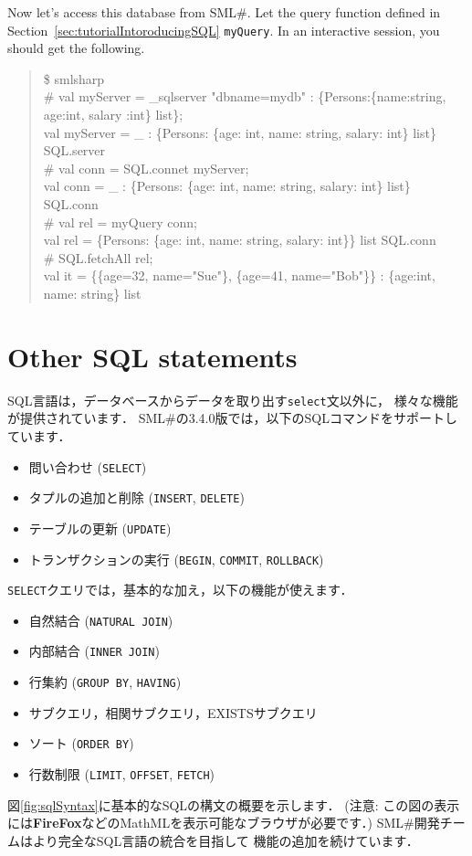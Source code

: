 \documentclass{jbook}
\newcommand{\txt}[2]{#2}
\newcommand{\smlsharp}{SML\#}
\newcommand{\version}{3.4.0}
\newenvironment{program}{\begin{quote}\begin{tt}}%
                        {\end{tt}\end{quote}}
\begin{document}
	Now let's access this database from \smlsharp{}.
	Let the query function defined in Section~\ref{sec:tutorialIntoroducingSQL}
{\tt myQuery}.
	In an interactive session, you should get the following.
\begin{program}
\$ smlsharp\\
\# val myServer = \_sqlserver "dbname=mydb" : \{Persons:\{name:string, age:int, salary :int\} list\};\\
val myServer = \_ : \{Persons: \{age: int, name: string, salary: int\} list\} SQL.server\\
\# val conn = SQL.connet myServer;\\
val conn = \_ : \{Persons: \{age: int, name: string, salary: int\} list\} SQL.conn\\
\# val rel = myQuery conn;\\
val rel = \{Persons: \{age: int, name: string, salary: int\}\} list SQL.conn\\
\# SQL.fetchAll rel;\\
val it = \{\{age=32, name="Sue"\}, \{age=41, name="Bob"\}\} : \{age:int, name: string\} list
\end{program}
\fi%

\section{\txt{その他のSQL文}{Other SQL statements}}
\label{sec:tutorialOtherSQLElement}

\ifjp%
	SQL言語は，データベースからデータを取り出す{\tt select}文以外に，
様々な機能が提供されています．
	\smlsharp{}の\version{}版では，以下のSQLコマンドをサポートしています．
\begin{itemize}
\item 問い合わせ ({\tt SELECT})
\item タプルの追加と削除 ({\tt INSERT}, {\tt DELETE}) 
\item テーブルの更新 ({\tt UPDATE})
\item トランザクションの実行 ({\tt BEGIN}, {\tt COMMIT}, {\tt ROLLBACK})
\end{itemize}
	{\tt SELECT}クエリでは，基本的な加え，以下の機能が使えます．
\begin{itemize}
\item 自然結合 ({\tt NATURAL JOIN})
\item 内部結合 ({\tt INNER JOIN})
\item 行集約 ({\tt GROUP BY}, {\tt HAVING})
\item サブクエリ，相関サブクエリ，EXISTSサブクエリ
\item ソート ({\tt ORDER BY})
\item 行数制限 ({\tt LIMIT}, {\tt OFFSET}, {\tt FETCH})
\end{itemize}
	図\ref{fig:sqlSyntax}に基本的なSQLの構文の概要を示します．
	(注意: この図の表示には{\bf FireFox}などのMathMLを表示可能なブラウザが必要です．)
	\smlsharp{}開発チームはより完全なSQL言語の統合を目指して
機能の追加を続けています．
\end{document}
